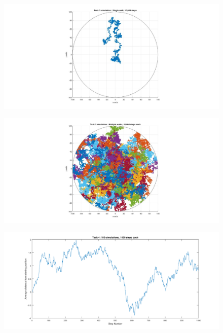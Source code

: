 \documentclass[10pt, a4paper]{article}
\begin{document}
\begin{figure}[H]
    \includegraphics[width=\textwidth]{Task 3 Testing/single_walk_Task_3.jpeg}
    \caption{}
    \label{fig:3}
\end{figure}

\begin{figure}[H]
    \includegraphics[width=\textwidth]{Task 3 Testing/multiple_walks_Task_3.jpeg}
    \caption{}
    \label{fig:4}
\end{figure}

\begin{figure}[H]
    \includegraphics[width=\textwidth]{Task 4 Testing/graph.png}
    \caption{}
    \label{fig:5}
\end{figure}
\end{document}
